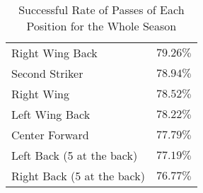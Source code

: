 \begin{table}[!htbp]
\begin{tabular}{l|c}
Right Wing Back                         & $79.26\%$                   \\
Second Striker                          & $78.94\%$                   \\
Right Wing                              & $78.52\%$                   \\
Left Wing Back                          & $78.22\%$                   \\
Center Forward                          & $77.79\%$                   \\
Left Back (5 at the back)               & $77.19\%$                   \\
Right Back (5 at the back)              & $76.77\%$                  
\end{tabular}
\caption{Successful Rate of Passes of Each Position for the Whole Season}
    \label{tab:positionPass}
\end{table}